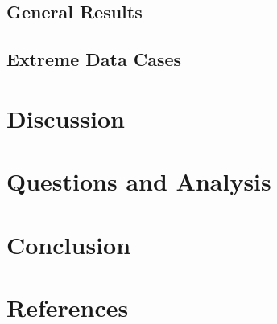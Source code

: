 \documentclass[12pt,a4paper]{report}
\begin{document}
    \section{General Results}

    \section{Extreme Data Cases}

\chapter{Discussion}

\chapter{Questions and Analysis}

\chapter{Conclusion}

\chapter*{References}
\end{document}
